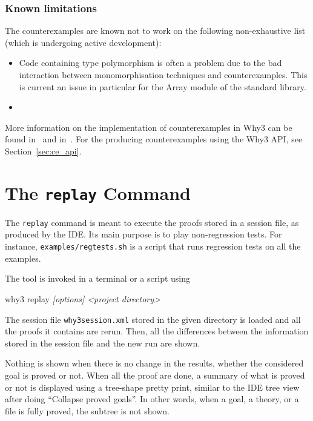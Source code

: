 \subsubsection{Known limitations}

The counterexamples are known not to work on the following non-exhaustive list
(which is undergoing active development):
\begin{itemize}
\item Code containing type polymorphism is often a problem due to the bad
  interaction between monomorphisation techniques and counterexamples. This is
  current an issue in particular for the Array module of the standard library.
\item{}
\end{itemize}

More information on the implementation of counterexamples in Why3 can
be found in~\cite{hauzar16sefm} and in~\cite{dailler18jlamp}.  For the
producing counterexamples using the Why3 API, see
Section~\ref{sec:ce_api}.

\section{The \texttt{replay} Command}
\label{sec:why3replayer}

The \texttt{replay} command is meant to execute the proofs
stored in a \why session file, as produced by the IDE. Its
main purpose is to play non-regression tests. For instance,
\texttt{examples/regtests.sh} is a script that runs regression tests on
all the examples.

The tool is invoked in a terminal or a script using
\begin{flushleft}\ttfamily
  why3 replay \textsl{[options] <project directory>}
\end{flushleft}
The session file \texttt{why3session.xml} stored in the given
directory is loaded and all the proofs it contains are rerun. Then,
all the differences between the information stored in the session file and
the new run are shown.

Nothing is shown when there is no change in the results, whether the
considered goal is proved or not. When all the proof
are done, a summary of what is proved or not is displayed using a
tree-shape pretty print, similar to the IDE tree view after doing
``Collapse proved goals''. In other words, when a goal, a theory, or a
file is fully proved, the subtree is not shown.


